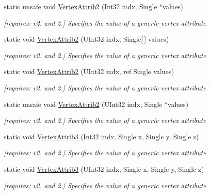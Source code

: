 \begin{DoxyCompactItemize}
static unsafe void \hyperlink{class_open_t_k_1_1_graphics_1_1_e_s20_1_1_g_l_ae68b737295f0fa85d0c547181679c06e}{Vertex\-Attrib2} (Int32 indx, Single $\ast$values)
\begin{DoxyCompactList}\small\item\em \mbox{[}requires\-: v2. and 2.\mbox{]} Specifies the value of a generic vertex attribute \end{DoxyCompactList}\item 
static void \hyperlink{class_open_t_k_1_1_graphics_1_1_e_s20_1_1_g_l_a95a3e2cbf258d9d7d50fe8f2e6e21a5e}{Vertex\-Attrib2} (U\-Int32 indx, Single\mbox{[}$\,$\mbox{]} values)
\begin{DoxyCompactList}\small\item\em \mbox{[}requires\-: v2. and 2.\mbox{]} Specifies the value of a generic vertex attribute \end{DoxyCompactList}\item 
static void \hyperlink{class_open_t_k_1_1_graphics_1_1_e_s20_1_1_g_l_acfa45feae01688031ba9316b53baf262}{Vertex\-Attrib2} (U\-Int32 indx, ref Single values)
\begin{DoxyCompactList}\small\item\em \mbox{[}requires\-: v2. and 2.\mbox{]} Specifies the value of a generic vertex attribute \end{DoxyCompactList}\item 
static unsafe void \hyperlink{class_open_t_k_1_1_graphics_1_1_e_s20_1_1_g_l_af54302fc20b8e338058e2e94b05b7f9d}{Vertex\-Attrib2} (U\-Int32 indx, Single $\ast$values)
\begin{DoxyCompactList}\small\item\em \mbox{[}requires\-: v2. and 2.\mbox{]} Specifies the value of a generic vertex attribute \end{DoxyCompactList}\item 
static void \hyperlink{class_open_t_k_1_1_graphics_1_1_e_s20_1_1_g_l_aab5db94d6b2c8d982878e99240c4d578}{Vertex\-Attrib3} (Int32 indx, Single x, Single y, Single z)
\begin{DoxyCompactList}\small\item\em \mbox{[}requires\-: v2. and 2.\mbox{]} Specifies the value of a generic vertex attribute \end{DoxyCompactList}\item 
static void \hyperlink{class_open_t_k_1_1_graphics_1_1_e_s20_1_1_g_l_a91aecc44a4a66b5f7abf8bfe11e0cc11}{Vertex\-Attrib3} (U\-Int32 indx, Single x, Single y, Single z)
\begin{DoxyCompactList}\small\item\em \mbox{[}requires\-: v2. and 2.\mbox{]} Specifies the value of a generic vertex attribute \end{DoxyCompactList}\item 

\end{DoxyCompactItemize}
